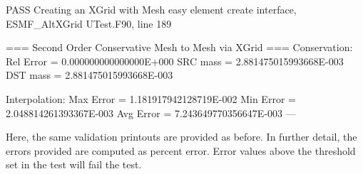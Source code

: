   PASS  Creating an XGrid with Mesh easy element create interface, ESMF_AltXGrid
 UTest.F90, line 189

 === Second Order Conservative Mesh to Mesh via XGrid ===
 Conservation:
 Rel Error =   0.000000000000000E+000
 SRC mass =   2.881475015993668E-003
 DST mass =   2.881475015993668E-003

 Interpolation:
 Max Error =   1.181917942128719E-002
 Min Error =   2.048814261393367E-003
 Avg Error =   7.243649770356647E-003
---

Here, the same validation printouts are provided as before. In further detail, the errors provided
are computed as percent error. Error values above the threshold set in the test will fail the test.
